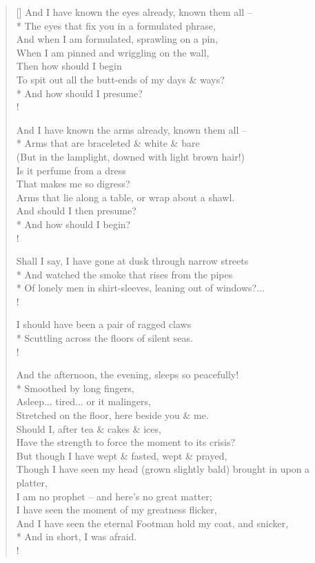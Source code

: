 \documentclass[MAIN]{subfiles}
\begin{document}
\begin{verse}[\versewidth]
And I have known the eyes already, known them all --\\*
The eyes that fix you in a formulated phrase,\\
And when I am formulated, sprawling on a pin,\\
When I am pinned and wriggling on the wall,\\
Then how should I begin\\
To spit out all the butt-ends of my days \& ways?\\*
And how should I presume?\\!

And I have known the arms already, known them all --\\*
Arms that are braceleted \& white \& bare\\
(But in the lamplight, downed with light brown hair!)\\
Is it perfume from a dress\\
That makes me so digress?\\
Arms that lie along a table, or wrap about a shawl.\\
And should I then presume?\\*
And how should I begin?\\!

Shall I say, I have gone at dusk through narrow streets\\*
And watched the smoke that rises from the pipes\\*
Of lonely men in shirt-sleeves, leaning out of windows?...\\!

I should have been a pair of ragged claws\\*
Scuttling across the floors of silent seas.\\!

And the afternoon, the evening, sleeps so peacefully!\\*
Smoothed by long fingers,\\
Asleep... tired... or it malingers,\\
Stretched on the floor, here beside you \& me.\\
Should I, after tea \& cakes \& ices,\\
Have the strength to force the moment to its crisis?\\
But though I have wept \& fasted, wept \& prayed,\\
Though I have seen my head (grown slightly bald) brought in upon a platter,\\
I am no prophet -- and here's no great matter;\\
I have seen the moment of my greatness flicker,\\
And I have seen the eternal Footman hold my coat, and snicker,\\*
And in short, I was afraid.\\!


\end{verse}
\end{document}
